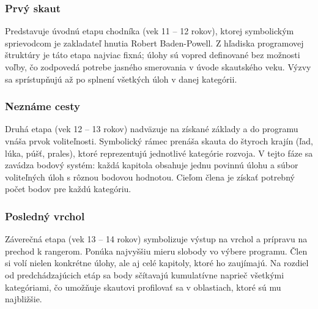 \subsubsection{Prvý skaut}
Predstavuje úvodnú etapu chodníka (vek 11 – 12 rokov), ktorej symbolickým sprievodcom je zakladateľ hnutia Robert Baden-Powell. Z hľadiska programovej štruktúry je táto etapa najviac fixná; úlohy sú vopred definované bez možnosti voľby, čo zodpovedá potrebe jasného smerovania v úvode skautského veku. Výzvy sa sprístupňujú až po splnení všetkých úloh v danej kategórii. \cite{prvy_skaut}

\subsubsection{Neznáme cesty}
Druhá etapa (vek 12 – 13 rokov) nadväzuje na získané základy a do programu vnáša prvok voliteľnosti. Symbolický rámec prenáša skauta do štyroch krajín (ľad, lúka, púšť, prales), ktoré reprezentujú jednotlivé kategórie rozvoja. V tejto fáze sa zavádza bodový systém: každá kapitola obsahuje jednu povinnú úlohu a súbor voliteľných úloh s rôznou bodovou hodnotou. Cieľom člena je získať potrebný počet bodov pre každú kategóriu. \cite{nezname_cesty}

\subsubsection{Posledný vrchol}
Záverečná etapa (vek 13 – 14 rokov) symbolizuje výstup na vrchol a prípravu na prechod k rangerom. Ponúka najvyššiu mieru slobody vo výbere programu. Člen si volí nielen konkrétne úlohy, ale aj celé kapitoly, ktoré ho zaujímajú. Na rozdiel od predchádzajúcich etáp sa body sčítavajú kumulatívne naprieč všetkými kategóriami, čo umožňuje skautovi profilovať sa v oblastiach, ktoré sú mu najbližšie. \cite{posledny_vrchol}

